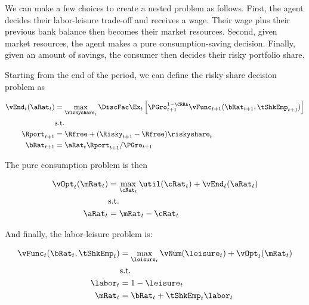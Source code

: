 \documentclass[\econtexRoot/EGMN]{subfiles}
\begin{document}
We can make a few choices to create a nested problem as follows. First, the
agent decides their labor-leisure trade-off and receives a wage. Their wage
plus their previous bank balance then becomes their market resources. Second, given
market resources, the agent makes a pure consumption-saving decision. Finally, given an amount of savings, the consumer then decides their risky portfolio share.

Starting from the end of the period, we can define the risky share decision problem as

\begin{equation}
    \begin{split}
        \vEnd_{t}(\aRat_{t}) & = \max_{\riskyshare_{t}} \DiscFac
        \Ex_{t} \left[ \PGro_{t+1}^{1-\CRRA}
            \vFunc_{t+1}(\bRat_{t+1},
            \tShkEmp_{t+1}) \right] \\
        & \text{s.t.} \\
        \Rport_{t+1} & = \Rfree + (\Risky_{t+1} - \Rfree)
        \riskyshare_{t} \\
        \bRat_{t+1} & = \aRat_{t} \Rport_{t+1} / \PGro_{t+1}
    \end{split}
\end{equation}

The pure consumption problem is then

\begin{equation}
    \begin{split}
        \vOpt_{t}(\mRat_{t}) & = \max_{\cRat_{t}} \util(\cRat_{t}) + \vEnd_{t}(\aRat_{t}) \\
        & \text{s.t.} \\
        \aRat_{t} & = \mRat_{t} - \cRat_{t}
    \end{split}
\end{equation}

And finally, the labor-leisure problem is:

\begin{equation}
    \begin{split}
        \vFunc_{t}(\bRat_{t}, \tShkEmp_{t}) & = \max_{ \leisure_{t}}
        \vNum(\leisure_{t}) + \vOpt_{t} (\mRat_{t}) \\
        & \text{s.t.} \\
        \labor_{t} & = 1 - \leisure_{t} \\
        \mRat_{t} & = \bRat_{t} + \tShkEmp_{t}\labor_{t} \\
    \end{split}
\end{equation}
\end{document}
